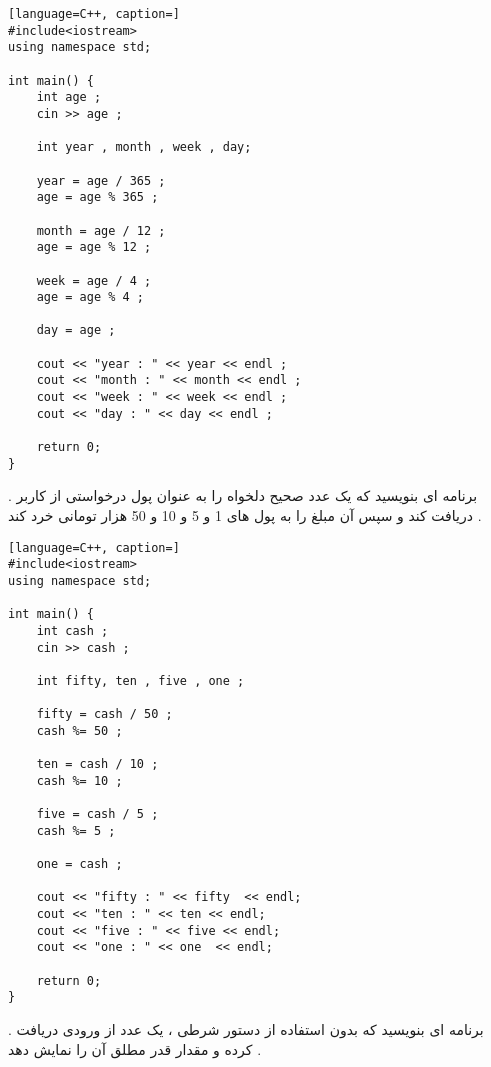 \documentclass[12pt]{article}
\begin{document}
\begin{latin}
\begin{lstlisting}[language=C++, caption=]
#include<iostream>
using namespace std;

int main() {
	int age ;
	cin >> age ;
	
	int year , month , week , day;
	
	year = age / 365 ;
	age = age % 365 ;
	
	month = age / 12 ;
	age = age % 12 ;
	
	week = age / 4 ;
	age = age % 4 ;
	
	day = age ;
	
	cout << "year : " << year << endl ;
	cout << "month : " << month << endl ;
	cout << "week : " << week << endl ;
	cout << "day : " << day << endl ;
	
	return 0;
}
\end{lstlisting}
\end{latin}




\newpage

 . برنامه ای بنویسید که
 یک عدد صحیح دلخواه را به عنوان پول درخواستی از کاربر دریافت کند و سپس آن مبلغ را به پول های 1 و 5 و 10 و 50 هزار تومانی خرد کند .
 
 
 
 
 \begin{latin}
\begin{lstlisting}[language=C++, caption=]
#include<iostream>
using namespace std;

int main() {
	int cash ;
	cin >> cash ;
	
	int fifty, ten , five , one ;
	
	fifty = cash / 50 ;
	cash %= 50 ;
	
	ten = cash / 10 ;
	cash %= 10 ;
	
	five = cash / 5 ;
	cash %= 5 ;
	
	one = cash ;
	
	cout << "fifty : " << fifty  << endl;
	cout << "ten : " << ten << endl;
	cout << "five : " << five << endl;
	cout << "one : " << one  << endl;
	
	return 0;
}
\end{lstlisting}
\end{latin}
 
 
 
 
\newpage
 
 . برنامه ای بنویسید که بدون استفاده از دستور شرطی 
،
یک عدد از ورودی دریافت کرده و مقدار قدر مطلق آن را نمایش دهد .
\end{document}
